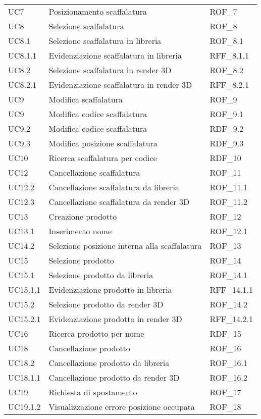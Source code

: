 \begin{xltabular}{\textwidth}{ p{0.3\textwidth} | X | p{0.2\textwidth} }
    UC7 & Posizionamento scaffalatura & ROF\_7\\
    UC8 & Selezione scaffalatura & ROF\_8\\
    UC8.1 & Selezione scaffalatura in libreria & ROF\_8.1\\
    UC8.1.1 & Evidenziazione scaffalatura in libreria & RFF\_8.1.1\\
    UC8.2 & Selezione scaffalatura in render 3D & ROF\_8.2\\
    UC8.2.1 & Evidenziazione scaffalatura in render 3D & RFF\_8.2.1\\
    UC9 & Modifica scaffalatura & ROF\_9\\
    UC9 & Modifica codice scaffalatura & ROF\_9.1\\
    UC9.2 & Modifica codice scaffalatura & RDF\_9.2\\
    UC9.3 & Modifica posizione scaffalatura & RDF\_9.3\\
    UC10 & Ricerca scaffalatura per codice & RDF\_10\\
    UC12 & Cancellazione scaffalatura & ROF\_11\\
    UC12.2 & Cancellazione scaffalatura da libreria & ROF\_11.1\\
    UC12.3 & Cancellazione scaffalatura da render 3D & ROF\_11.2\\
    UC13 & Creazione prodotto & ROF\_12\\
    UC13.1 & Inserimento nome & ROF\_12.1\\
    UC14.2 & Selezione posizione interna alla scaffalatura & ROF\_13\\
    UC15 & Selezione prodotto & ROF\_14\\
    UC15.1 & Selezione prodotto da libreria & ROF\_14.1\\
    UC15.1.1 & Evidenziazione prodotto in libreria & RFF\_14.1.1\\
    UC15.2 & Selezione prodotto da render 3D & ROF\_14.2\\
    UC15.2.1 & Evidenziazione prodotto in render 3D & RFF\_14.2.1\\
    UC16 & Ricerca prodotto per nome & RDF\_15\\
    UC18 & Cancellazione prodotto & ROF\_16\\
    UC18.2 & Cancellazione prodotto da libreria & ROF\_16.1\\
    UC18.1.1 & Cancellazione prodotto da render 3D & ROF\_16.2\\
    UC19 & Richiesta di spostamento & ROF\_17\\
    UC19.1.2 & Visualizzazione errore posizione occupata & ROF\_18\\
    
    \hline
\end{xltabular}

